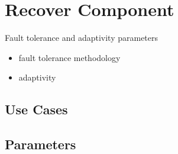
\section{Recover Component} \label{s:component-recover}

Fault tolerance and adaptivity parameters

\begin{itemize}
\item fault tolerance methodology
\item adaptivity
\end{itemize}

\subsection{Use Cases}
\subsection{Parameters}
